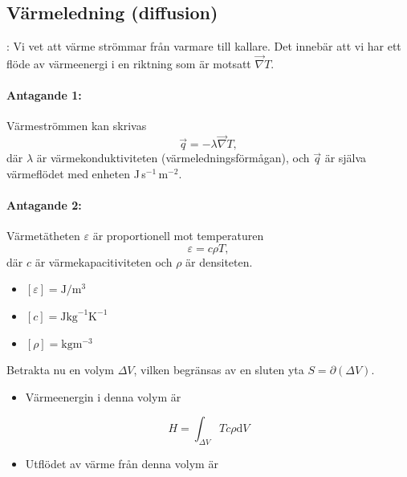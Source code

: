 \documentclass[%
oneside,                 %
final,                   %
10pt]{article}
\newcommand{\longinlinecomment}[3]{{\color{red}{\bf #1}: #2}}
\begin{document}
\subsection{Värmeledning (diffusion)}

\longinlinecomment{Comment 1}{ Vi vet att värme strömmar från varmare till kallare.  Det innebär att vi har ett flöde av värmeenergi i en riktning som är motsatt $\vec{\nabla} T$. }{ Vi vet att värme }

\paragraph{Antagande 1:}
Värmeströmmen kan skrivas
\begin{equation}
  \vec{q} = -\lambda\vec{\nabla} T,
\end{equation}
där $\lambda$ är värmekonduktiviteten (värmeledningsförmågan), och $\vec{q}$ är själva 
värmeflödet med enheten J\,s$^{-1}$\,m$^{-2}$.

\paragraph{Antagande 2:}
Värmetätheten $\varepsilon$ är proportionell mot temperaturen
$$
\varepsilon = c \rho T,
$$
där $c$ är värmekapacitiviteten och $\rho$ är densiteten.
\begin{itemize}
\item $[\varepsilon] = \mathrm{J}/\mathrm{m}^3$

\item $[c] = \mathrm{J} \mathrm{kg}^{-1} \mathrm{K}^{-1}$

\item $[\rho] = \mathrm{kg} \mathrm{m}^{-3}$
\end{itemize}

\noindent
Betrakta nu en volym $\Delta V$, vilken begränsas av en sluten yta $S = \partial(\Delta V)$.  
\begin{itemize}
\item Värmeenergin i denna volym är
\end{itemize}

\noindent
\begin{equation}
  H = \int_{\Delta V} Tc\rho \mbox{d}V
  \label{eq:H}
\end{equation}
\begin{itemize}
\item Utflödet av värme från denna volym är 
\end{itemize}
\end{document}
